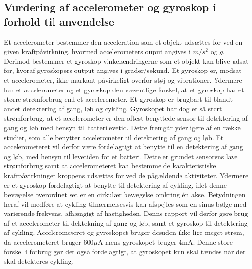 \subsection{Vurdering af accelerometer og gyroskop i forhold til anvendelse}
Et accelerometer bestemmer den acceleration som et objekt udsættes for ved en given kraftpåvirkning, hvormed accelerometers ouput angives i $m/s^2$ og $g$. Derimod bestemmer et gyroskop vinkelændringerne som et objekt kan blive udsat for, hvoraf gyroskopers output angives i grader/sekund. Et gyroskop er, modsat et accelerometer, ikke markant påvirkeligt overfor støj og vibrationer. \citep{Goodrich2013,TittertonWeston2004,LuingeVeltink2005} \newline
Ydermere har et accelerometer og et gyroskop den væsentlige forskel, at et gyroskop har et større strømforbrug end et accelerometer.  Et gyroskop er brugbart til blandt andet detektering af gang, løb og cykling. Gyroskopet har dog et så stort strømforbrug, at et accelerometer er den oftest benyttede sensor til detektering af gang og løb med hensyn til batterilevetid. Dette fremgår yderligere af en række studier, som alle benytter accelerometer til detektering af gang og løb. \citep{Rueterbories2010,Sparkfun,ClelandKikhia2013} \newline
Et accelerometeret vil derfor være fordelagtigt at benytte til en detektering af gang og løb, med hensyn til levetiden for et batteri. Dette er grundet sensorens lave strømforbrug samt at accelerometeret kan bestemme de karakteristiske kraftpåvirkninger kroppens udsættes for ved de pågældende aktiviteter. Ydermere er et gyroskop fordelagtigt at benytte til detektering af cykling, idet denne bevægelse overordnet set er en cirkulær bevægelse omkring én akse. Betydningen heraf vil medføre at cykling tilnærmelsesvis kan afspejles som en sinus bølge med varierende frekvens, afhængigt af hastigheden. \newline
Denne rapport vil derfor gøre brug af et accelerometer til dektekning af gang og løb, samt et gyroskop til detektering af cykling. Accelerometeret og gyroskopet bruger desuden ikke lige meget strøm, da accelerometeret bruger 600$\mu$A mens gyroskopet bruger 4mA. Denne store forskel i forbrug gør det også fordelagtigt, at gyroskopet kun skal tændes når der skal detekteres cykling.